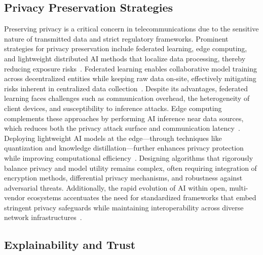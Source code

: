 \documentclass[sigconf]{acmart}
\begin{document}
\subsection{Privacy Preservation Strategies}

Preserving privacy is a critical concern in telecommunications due to the sensitive nature of transmitted data and strict regulatory frameworks. Prominent strategies for privacy preservation include federated learning, edge computing, and lightweight distributed AI methods that localize data processing, thereby reducing exposure risks~\cite{ref48,ref49,ref50,ref52}. Federated learning enables collaborative model training across decentralized entities while keeping raw data on-site, effectively mitigating risks inherent in centralized data collection~\cite{ref49}. Despite its advantages, federated learning faces challenges such as communication overhead, the heterogeneity of client devices, and susceptibility to inference attacks. Edge computing complements these approaches by performing AI inference near data sources, which reduces both the privacy attack surface and communication latency~\cite{ref52}. Deploying lightweight AI models at the edge—through techniques like quantization and knowledge distillation—further enhances privacy protection while improving computational efficiency~\cite{ref50}. Designing algorithms that rigorously balance privacy and model utility remains complex, often requiring integration of encryption methods, differential privacy mechanisms, and robustness against adversarial threats. Additionally, the rapid evolution of AI within open, multi-vendor ecosystems accentuates the need for standardized frameworks that embed stringent privacy safeguards while maintaining interoperability across diverse network infrastructures~\cite{ref48,ref52}.

\subsection{Explainability and Trust}
\end{document}
